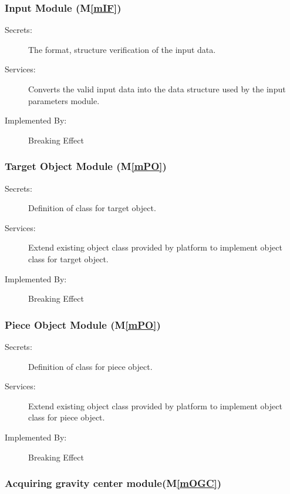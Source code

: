 \documentclass[12pt, titlepage]{article}
\newcommand{\mref}[1]{M\ref{#1}}
\begin{document}
	\subsubsection{Input Module (\mref{mIF})}
	
	\begin{description}
		\item[Secrets:]The format, structure verification of the input data.
		\item[Services:]Converts the valid input data into the data structure used by the
		input parameters module. 
		\item[Implemented By:] Breaking Effect
	\end{description}
	
	\subsubsection{Target Object Module (\mref{mPO})}
	
	\begin{description}
		\item[Secrets:]Definition of class for target object.
		\item[Services:]Extend existing object class provided by platform to implement object class for target object. 
		\item[Implemented By:] Breaking Effect
	\end{description}
	
	\subsubsection{Piece Object Module (\mref{mPO})}
	
	\begin{description}
		\item[Secrets:]Definition of class for piece object.
		\item[Services:]Extend existing object class provided by
                  platform to implement object class for piece object.  
		\item[Implemented By:] Breaking Effect
	\end{description}
	
	\subsubsection{Acquiring gravity center module(\mref{mOGC})}
	
\end{document}
